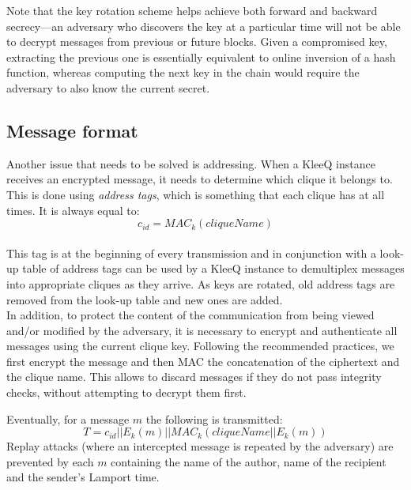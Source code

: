 \documentclass[a4paper, twoside, 12pt]{report}
\begin{document}
Note that the key rotation scheme helps achieve both forward and backward secrecy---an adversary who discovers the key at a particular time will not be able to decrypt messages from previous or future blocks. Given a compromised key, extracting the previous one is essentially equivalent to online inversion of a hash function, whereas computing the next key in the chain would require the adversary to also know the current secret.


\subsection{Message format}
\label{ssec:prep.proto.msg_fmt}
Another issue that needs to be solved is addressing. When a KleeQ instance receives an encrypted message, it needs to determine which clique it belongs to. This is done using \emph{address tags}, which is something that each clique has at all times. It is always equal to:
\begin{equation*}
    c_{id} = MAC_{k}(cliqueName)
\end{equation*} \\
This tag is at the beginning of every transmission and in conjunction with a look-up table of address tags can be used by a KleeQ instance to demultiplex messages into appropriate cliques as they arrive. As keys are rotated, old address tags are removed from the look-up table and new ones are added.\\

In addition, to protect the content of the communication from being viewed and/or modified by the adversary, it is necessary to encrypt and authenticate all messages using the current clique key. Following the recommended practices, we first encrypt the message and then MAC the concatenation of the ciphertext and the clique name. This allows to discard messages if they do not pass integrity checks, without attempting to decrypt them first.

Eventually, for a message $m$ the following is transmitted:
\begin{equation*}
    T = c_{id} || E_k(m) || MAC_k(cliqueName || E_k(m))
\end{equation*}
Replay attacks (where an intercepted message is repeated by the adversary) are prevented by each $m$ containing the name of the author, name of the recipient and the sender's Lamport time.

\pagebreak

\end{document}
